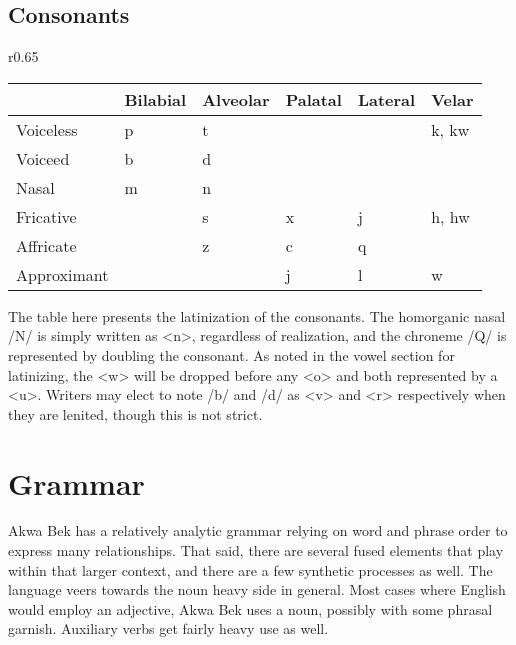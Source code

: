 \documentclass[11pt,letterpaper]{article}
\begin{document}
  \subsection{Consonants}
  \begin{wrapfigure}{r}{0.65\textwidth}
    \begin{tabular}{|l|l|l|l|l|l|}
      \hline
                  & Bilabial   & Alveolar & Palatal & Lateral & Velar     \\ \hline \hline
      Voiceless   & p          & t        &         &         & k, kw     \\
      Voiceed     & b          & d        &         &         &           \\
      Nasal       & m          & n        &         &         &           \\
      Fricative   &            & s        & x       &  j      & h, hw     \\
      Affricate   &            & z        & c       &  q      &           \\
      Approximant &            &          & j       &  l      & w         \\ \hline
    \end{tabular}
  \end{wrapfigure}
  The table here presents the latinization of the consonants. The homorganic nasal /N/ is simply written as <n>, regardless of realization, and the chroneme /Q/ is represented by doubling the consonant. As noted in the vowel section for latinizing, the <w> will be dropped before any <o> and both represented by a <u>. Writers may elect to note /b/ and /d/ as <v> and <r> respectively when they are lenited, though this is not strict.

\pagebreak
  

\section{Grammar}
\label{grammar}
Akwa Bek has a relatively analytic grammar relying on word and phrase order to express many relationships. That said, there are several fused elements that play within that larger context, and there are a few synthetic processes as well. The language veers towards the noun heavy side in general. Most cases where English would employ an adjective, Akwa Bek uses a noun, possibly with some phrasal garnish. Auxiliary verbs get fairly heavy use as well.
\end{document}
